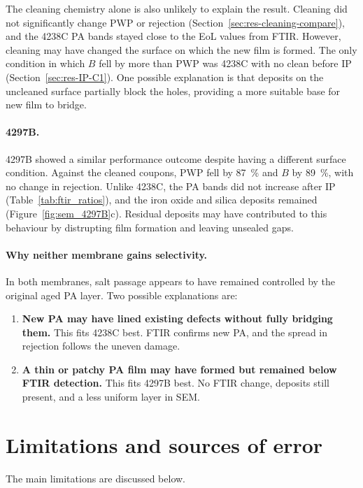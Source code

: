 The cleaning chemistry alone is also unlikely to explain the result. Cleaning did not significantly change PWP or rejection (Section~\ref{sec:res-cleaning-compare}), and the 4238C PA bands stayed close to the EoL values from FTIR. However, cleaning may have changed the surface on which the new film is formed. The only condition in which $B$ fell by more than PWP was 4238C with no clean before IP (Section~\ref{sec:res-IP-C1}). One possible explanation is that deposits on the uncleaned surface partially block the holes, providing a more suitable base for new film to bridge.

\paragraph{4297B.}
4297B showed a similar performance outcome despite having a different surface condition. Against the cleaned coupons, PWP fell by \qty{87}{\percent} and $B$ by \qty{89}{\percent}, with no change in rejection. Unlike 4238C, the PA bands did not increase after IP (Table~\ref{tab:ftir_ratios}), and the iron oxide and silica deposits remained (Figure~\ref{fig:sem_4297B}c). Residual deposits may have contributed to this behaviour by distrupting film formation and leaving unsealed gaps. 

\paragraph{Why neither membrane gains selectivity.}
In both membranes, salt passage appears to have remained controlled by the original aged PA layer. Two possible explanations are:
\begin{enumerate}[nosep]
  \item \textbf{New PA may have lined existing defects without fully bridging them.} This fits 4238C best. FTIR confirms new PA, and the spread in rejection follows the uneven damage.
  \item \textbf{A thin or patchy PA film may have formed but remained below FTIR detection.} This fits 4297B best. No FTIR change, deposits still present, and a less uniform layer in SEM.
\end{enumerate}



\section{Limitations and sources of error}
\label{sec:res-limitations}
The main limitations are discussed below.

